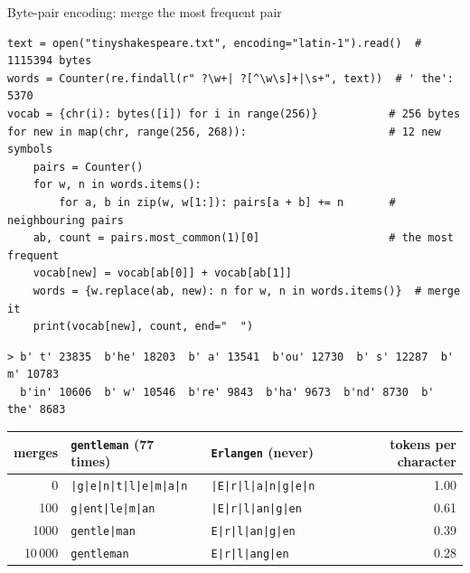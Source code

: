 \documentclass[10pt]{beamer}
\begin{document}
\begin{frame}[fragile]{Byte-pair encoding: merge the most frequent pair}
\def\tokbar{\textcolor{black!40}{|}}
\begin{lstlisting}
text = open("tinyshakespeare.txt", encoding="latin-1").read()  # 1115394 bytes
words = Counter(re.findall(r" ?\w+| ?[^\w\s]+|\s+", text))  # ' the': 5370
vocab = {chr(i): bytes([i]) for i in range(256)}           # 256 bytes
for new in map(chr, range(256, 268)):                      # 12 new symbols
    pairs = Counter()
    for w, n in words.items():
        for a, b in zip(w, w[1:]): pairs[a + b] += n       # neighbouring pairs
    ab, count = pairs.most_common(1)[0]                    # the most frequent
    vocab[new] = vocab[ab[0]] + vocab[ab[1]]
    words = {w.replace(ab, new): n for w, n in words.items()}  # merge it
    print(vocab[new], count, end="  ")
\end{lstlisting}
\begin{lstlisting}[style=output]
> b' t' 23835  b'he' 18203  b' a' 13541  b'ou' 12730  b' s' 12287  b' m' 10783
  b'in' 10606  b' w' 10546  b're' 9843  b'ha' 9673  b'nd' 8730  b' the' 8683
\end{lstlisting}
\scriptsize
\setlength{\tabcolsep}{4pt}
\begin{tabularx}{\textwidth}{@{}r X X r@{}}
\toprule
merges\footnotemark & \texttt{\textvisiblespace gentleman} (77 times) & \texttt{\textvisiblespace Erlangen} (never) & tokens per character \\
\midrule
0 & \texttt{\textvisiblespace\tokbar g\tokbar e\tokbar n\tokbar t\tokbar l\tokbar e\tokbar m\tokbar a\tokbar n}
  & \texttt{\textvisiblespace\tokbar E\tokbar r\tokbar l\tokbar a\tokbar n\tokbar g\tokbar e\tokbar n} & 1.00 \\
100 & \texttt{\textvisiblespace g\tokbar ent\tokbar le\tokbar m\tokbar an}
  & \texttt{\textvisiblespace\tokbar E\tokbar r\tokbar l\tokbar an\tokbar g\tokbar en} & 0.61 \\
1000 & \texttt{\textvisiblespace gentle\tokbar man}
  & \texttt{\textvisiblespace E\tokbar r\tokbar l\tokbar an\tokbar g\tokbar en} & 0.39 \\
10\,000 & \texttt{\textvisiblespace gentleman}
  & \texttt{\textvisiblespace E\tokbar r\tokbar l\tokbar ang\tokbar en} & 0.28 \\
\bottomrule
\end{tabularx}
\end{frame}
\end{document}
